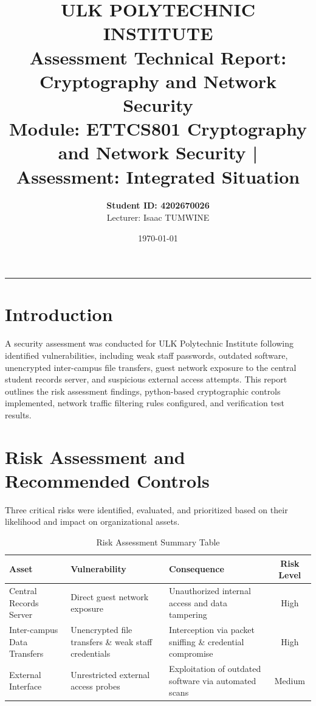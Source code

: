 \documentclass[11pt,a4paper]{article}
\title{\textbf{ULK POLYTECHNIC INSTITUTE}\\
\large Assessment Technical Report: Cryptography and Network Security\\
\small Module: ETTCS801 Cryptography and Network Security | Assessment: Integrated Situation}
\author{\textbf{Student ID: 4202670026}\\ Lecturer: Isaac TUMWINE}
\date{\today}
\begin{document}
\maketitle

\hrule
\vspace{0.5cm}

\section{Introduction}
A security assessment was conducted for ULK Polytechnic Institute following identified vulnerabilities, including weak staff passwords, outdated software, unencrypted inter-campus file transfers, guest network exposure to the central student records server, and suspicious external access attempts. This report outlines the risk assessment findings, python-based cryptographic controls implemented, network traffic filtering rules configured, and verification test results.

\section{Risk Assessment and Recommended Controls}
Three critical risks were identified, evaluated, and prioritized based on their likelihood and impact on organizational assets.

\begin{table}[h!]
\centering
\small
\begin{tabular}{p{3.2cm}p{3.8cm}p{4cm}c}
\toprule
\textbf{Asset} & \textbf{Vulnerability} & \textbf{Consequence} & \textbf{Risk Level} \\
\midrule
Central Records Server & Direct guest network exposure & Unauthorized internal access and data tampering & High \\
Inter-campus Data Transfers & Unencrypted file transfers \& weak staff credentials & Interception via packet sniffing \& credential compromise & High \\
External Interface & Unrestricted external access probes & Exploitation of outdated software via automated scans & Medium \\
\bottomrule
\end{tabular}
\caption{Risk Assessment Summary Table}
\label{tab:risk_matrix}
\end{table}
\end{document}
